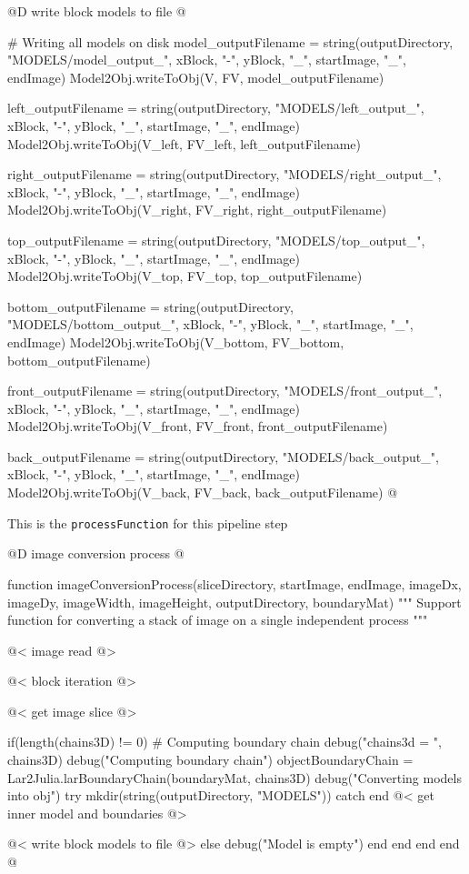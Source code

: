 \documentclass[11pt,oneside]{article}	%
\begin{document}
@D write block models to file
@{# Writing all models on disk
model_outputFilename = string(outputDirectory, "MODELS/model_output_", xBlock,
				"-", yBlock, "_", startImage, "_", endImage)
Model2Obj.writeToObj(V, FV, model_outputFilename)

left_outputFilename = string(outputDirectory, "MODELS/left_output_", xBlock,
				"-", yBlock, "_", startImage, "_", endImage)
Model2Obj.writeToObj(V_left, FV_left, left_outputFilename)

right_outputFilename = string(outputDirectory, "MODELS/right_output_", xBlock,
				"-", yBlock, "_", startImage, "_", endImage)
Model2Obj.writeToObj(V_right, FV_right, right_outputFilename)

top_outputFilename = string(outputDirectory, "MODELS/top_output_", xBlock,
				"-", yBlock, "_", startImage, "_", endImage)
Model2Obj.writeToObj(V_top, FV_top, top_outputFilename)

bottom_outputFilename = string(outputDirectory, "MODELS/bottom_output_", xBlock,
				"-", yBlock, "_", startImage, "_", endImage)
Model2Obj.writeToObj(V_bottom, FV_bottom, bottom_outputFilename)

front_outputFilename = string(outputDirectory, "MODELS/front_output_", xBlock,
				"-", yBlock, "_", startImage, "_", endImage)
Model2Obj.writeToObj(V_front, FV_front, front_outputFilename)

back_outputFilename = string(outputDirectory, "MODELS/back_output_", xBlock,
				"-", yBlock, "_", startImage, "_", endImage)
Model2Obj.writeToObj(V_back, FV_back, back_outputFilename) @}

This is the \texttt{processFunction} for this pipeline step

@D image conversion process
@{function imageConversionProcess(sliceDirectory,
			      startImage, endImage,
			      imageDx, imageDy,
			      imageWidth, imageHeight,
			      outputDirectory,
			      boundaryMat)
  """
  Support function for converting a stack of image on a single
  independent process
  """

  @< image read @>
  
  @< block iteration @>

      @< get image slice @>
      
      if(length(chains3D) != 0)
        # Computing boundary chain
        debug("chains3d = ", chains3D)
        debug("Computing boundary chain")
        objectBoundaryChain = Lar2Julia.larBoundaryChain(boundaryMat, chains3D)
        debug("Converting models into obj")
        try
          mkdir(string(outputDirectory, "MODELS"))
        catch
        end
        @< get inner model and boundaries @>
        
        @< write block models to file @>
      else
        debug("Model is empty")
      end
    end
  end
end @}
\end{document}
